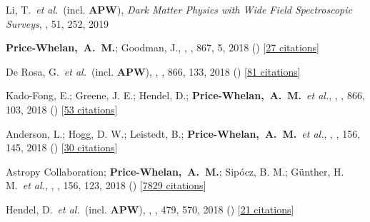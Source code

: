 {\item[{\color{deemph}\scriptsize48}]Li, T.~\textit{et al.}~(incl. \textbf{APW}), \textit{Dark Matter Physics with Wide Field Spectroscopic Surveys}, \baas, 51, 252, 2019

\item[{\color{deemph}\scriptsize47}]\textbf{Price-Whelan,~A.~M.}; Goodman, J., , \apj, 867, 5, 2018 () [\href{http://adsabs.harvard.edu/abs/2018ApJ...867....5P}{27 citations}]

\item[{\color{deemph}\scriptsize46}]De Rosa, G.~\textit{et al.}~(incl. \textbf{APW}), , \apj, 866, 133, 2018 () [\href{http://adsabs.harvard.edu/abs/2018ApJ...866..133D}{81 citations}]

\item[{\color{deemph}\scriptsize45}]Kado-Fong, E.; Greene, J. E.; Hendel, D.; \textbf{Price-Whelan,~A.~M.}~\textit{et al.}, , \apj, 866, 103, 2018 () [\href{http://adsabs.harvard.edu/abs/2018ApJ...866..103K}{53 citations}]

\item[{\color{deemph}\scriptsize44}]Anderson, L.; Hogg, D. W.; Leistedt, B.; \textbf{Price-Whelan,~A.~M.}~\textit{et al.}, , \aj, 156, 145, 2018 () [\href{http://adsabs.harvard.edu/abs/2018AJ....156..145A}{30 citations}]

\item[{\color{deemph}\scriptsize43}]Astropy Collaboration; \textbf{Price-Whelan,~A.~M.}; Sip{\'{o}}cz, B. M.; G{\"u}nther, H. M.~\textit{et al.}, , \aj, 156, 123, 2018 () [\href{http://adsabs.harvard.edu/abs/2018AJ....156..123A}{7829 citations}]

\item[{\color{deemph}\scriptsize42}]Hendel, D.~\textit{et al.}~(incl. \textbf{APW}), , \mnras, 479, 570, 2018 () [\href{http://adsabs.harvard.edu/abs/2018MNRAS.479..570H}{21 citations}]

}
